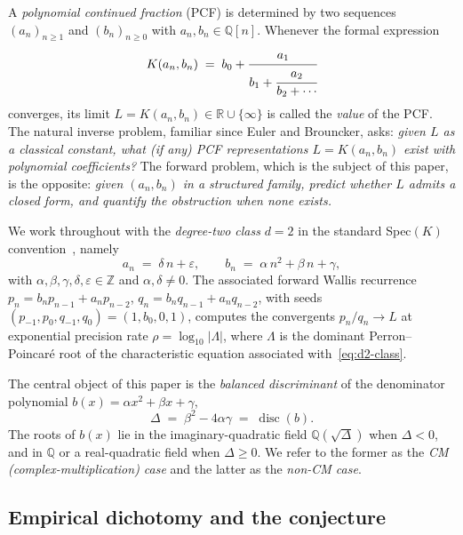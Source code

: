 \documentclass[11pt,reqno]{amsart}
\theoremstyle{definition}
\DeclareMathOperator{\disc}{disc}
\begin{document}
A \emph{polynomial continued fraction} (PCF) is determined by two
sequences $(a_{n})_{n\ge 1}$ and $(b_{n})_{n\ge 0}$ with
$a_{n},b_{n}\in\mathbb{Q}[n]$. Whenever the formal expression
\begin{equation}\label{eq:PCF}
K(a_{n},b_{n})
\;=\;
b_{0} + \cfrac{a_{1}}{b_{1} + \cfrac{a_{2}}{b_{2} + \cdots}}
\end{equation}
converges, its limit
$L = K(a_{n},b_{n}) \in \mathbb{R}\cup\{\infty\}$ is called the
\emph{value} of the PCF. The natural inverse problem,
familiar since Euler and Brouncker, asks: \emph{given $L$ as a
classical constant, what (if any) PCF representations
$L = K(a_{n},b_{n})$ exist with polynomial coefficients?}
The forward problem, which is the subject of this paper, is the
opposite: \emph{given $(a_{n}, b_{n})$ in a structured family,
predict whether $L$ admits a closed form, and quantify the
obstruction when none exists.}

We work throughout with the \emph{degree-two class}
$d=2$ in the standard Spec$(K)$ convention~\cite{Papanokechi2026Spec},
namely
\begin{equation}\label{eq:d2-class}
a_{n} \;=\; \delta\,n + \varepsilon, \qquad
b_{n} \;=\; \alpha\,n^{2} + \beta\,n + \gamma,
\end{equation}
with $\alpha,\beta,\gamma,\delta,\varepsilon\in\mathbb{Z}$ and
$\alpha,\delta\neq 0$. The associated forward Wallis recurrence
$p_{n} = b_{n}p_{n-1} + a_{n}p_{n-2}$,
$q_{n} = b_{n}q_{n-1} + a_{n}q_{n-2}$,
with seeds $(p_{-1},p_{0},q_{-1},q_{0})=(1,b_{0},0,1)$, computes
the convergents $p_{n}/q_{n}\to L$ at exponential precision rate
$\rho = \log_{10}|\Lambda|$, where
$\Lambda$ is the dominant Perron--Poincar\'e root of the
characteristic equation associated with~\eqref{eq:d2-class}.

The central object of this paper is the \emph{balanced
discriminant} of the denominator polynomial $b(x) = \alpha x^{2} +
\beta x + \gamma$,
\begin{equation}\label{eq:Delta}
\Delta \;=\; \beta^{2} - 4\alpha\gamma \;=\; \disc(b).
\end{equation}
The roots of $b(x)$ lie in the imaginary-quadratic field
$\mathbb{Q}(\sqrt{\Delta})$ when $\Delta<0$, and in $\mathbb{Q}$
or a real-quadratic field when $\Delta\ge 0$. We refer to the
former as the \emph{CM (complex-multiplication) case} and the
latter as the \emph{non-CM case}.

\subsection{Empirical dichotomy and the conjecture}
\end{document}
